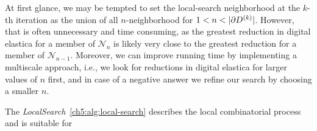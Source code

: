  At first glance, we may be tempted to set the local-search neighborhood at the $k$-th iteration as the union of all $n$-neighborhood for $1<n<|\partial \Ds^{(k)}|$. However, that is often unnecessary and time consuming, as the greatest reduction in digital elastica for a member of $\mathcal{N}_n$ is likely very close to the greatest reduction for a member of $\mathcal{N}_{n-1}$. Moreover, we can improve running time by implementing a multiscale approach, i.e., we look for reductions in digital elastica for larger values of $n$ first, and in case of a negative answer we refine our search by choosing a smaller $n$.

The \emph{LocalSearch}~\cref{ch5:alg:local-search} describes the local combinatorial process and is suitable for  

	


